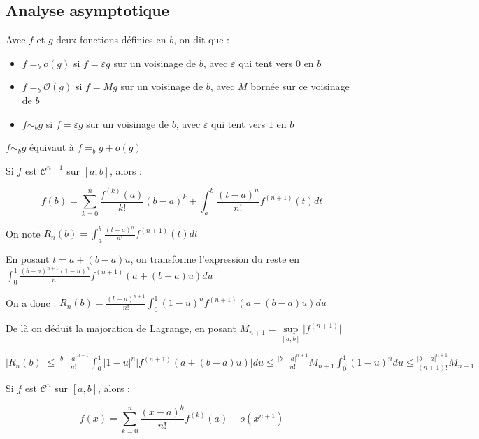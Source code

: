 \documentclass[a4paper,12pt]{book}
\newcommand{\Def}[2]{\begin{tcolorbox}[colback=white,colframe=red!10!green!20!blue!75!, title=Définition : #1]#2\end{tcolorbox}}
\newcommand{\Thr}[2]{\begin{tcolorbox}[sharp corners, colback=white,colframe=red!10!blue!30!green!75!, title=Théorème : #1]#2\end{tcolorbox}}
\begin{document}
\subsection{Analyse asymptotique}
\Def{}{Avec $f$ et $g$ deux fonctions définies en $b$, on dit que :\begin{itemize}
\item $f =_b o(g)$ si $f = \varepsilon g$ sur un voisinage de $b$, avec $\varepsilon$ qui tent vers $0$ en $b$
\item $f =_b \mathcal{O}(g)$ si $f = M g$ sur un voisinage de $b$, avec $M$ bornée sur ce voisinage de $b$
\item $f \sim_b g$ si $f = \varepsilon g$ sur un voisinage de $b$, avec $\varepsilon$ qui tent vers $1$ en $b$
\end{itemize}
$f\sim_b g$ équivaut à $f =_b g+o(g)$ 
}
\Thr{Taylor-Reste-Intégral}{Si $f$ est $\mathcal{C}^{n+1}$ sur $[a,b]$, alors :
\par $$f(b) = \sum\limits_{k=0}^n \frac{f^{(k)}(a)}{k!}(b-a)^k +\int_a^b\frac{(t-a)^n}{n!}f^{(n+1)}(t)dt$$
\par On note $R_n(b) = \int_a^b\frac{(t-a)^n}{n!}f^{(n+1)}(t)dt$}
\Thr{Taylor-Lagrange}{En posant $t = a+(b-a)u$, on transforme l'expression du reste en $\int_0^1\frac{(b-a)^{n+1}(1-u)^n}{n!}f^{(n+1)}(a+(b-a)u)du$
\par On a donc : $R_n(b) = \frac{(b-a)^{n+1}}{n!}\int_0^1(1-u)^nf^{(n+1)}(a+(b-a)u)du$ \par De là on déduit la majoration de Lagrange, en posant $M_{n+1} = \sup\limits_{[a,b]}\vert f^{(n+1)}\vert$
\par $\vert R_n(b)\vert \leq \frac{\vert b-a\vert^{n+1}}{n!}\int_0^1\vert 1-u\vert^n\vert f^{(n+1)}(a+(b-a)u)\vert du \leq \frac{\vert b-a\vert^{n+1}}{n!}M_{n+1}\int_0^1(1-u)^ndu\leq \frac{\vert b-a\vert^{n+1}}{(n+1)!}M_{n+1}$}
\Thr{Taylor-Young}{Si $f$ est $\mathcal{C}^n$ sur $[a,b]$, alors :
\par $$f(x) = \sum\limits_{k=0}^n\dfrac{(x-a)^k}{n!}f^{(k)}(a)+o(x^{n+1})$$}
\end{document}
